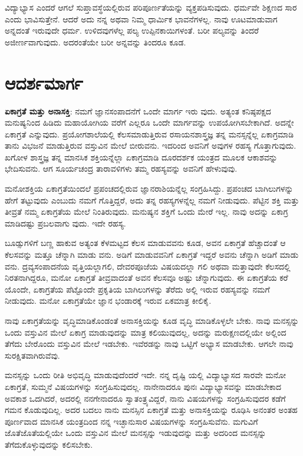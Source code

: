 ವಿದ್ಯಾಭ್ಯಾಸ ಎಂದರೆ ಆಗಲೆ ಸುಪ್ತಾವಸ್ಥೆಯಲ್ಲಿರುವ ಪರಿಪೂರ್ಣತೆಯನ್ನು ವ್ಯಕ್ತಪಡಿಸುವುದು. ಧರ್ಮವೇ ಶಿಕ್ಷಣದ ಸಾರ ಎಂದು ಭಾವಿಸುತ್ತೇನೆ. ಆದರೆ ಅದು ನನ್ನ ಅಥವಾ ನಿಮ್ಮ ಧಾರ್ಮಿಕ ಭಾವನೆಗಳಲ್ಲ. ನಾವು ಊಟಮಾಡುವಾಗ ಅನ್ನದಂತೆ ಇರುವುದೇ ಧರ್ಮ. ಉಳಿದವುಗಳೆಲ್ಲ ಪಲ್ಯ ಉಪ್ಪಿನಕಾಯಿಗಳಂತೆ. ಬರೀ ಪಲ್ಯವನ್ನು ತಿಂದರೆ ಅಜೀರ್ಣವಾಗುವುದು. ಅದರಂತೆಯೇ ಬರೀ ಅನ್ನವನ್ನು ತಿಂದರೂ ಕೂಡ.


\section{ಆದರ್ಶಮಾರ್ಗ}

\textbf{ಏಕಾಗ್ರತೆ ಮತ್ತು ಅನಾಸಕ್ತಿ}: ನಮಗೆ ಜ್ಞಾನಸಂಪಾದನೆಗೆ ಒಂದೇ ಮಾರ್ಗ ಇರು ವುದು. ಅತ್ಯಂತ ಕನಿಷ್ಠಪಕ್ಷದ ಮನುಷ್ಯನಿಂದ ಹಿಡಿದು ಮಹಾಯೋಗಿಯ ವರೆಗೆ ಎಲ್ಲರೂ ಒಂದೇ ಮಾರ್ಗವನ್ನು ಉಪಯೋಗಿಸಬೇಕಾಗಿದೆ. ಅದನ್ನೇ ಏಕಾಗ್ರತೆ ಎನ್ನುವುದು. ಪ್ರಯೋಗಶಾಲೆಯಲ್ಲಿ ಕೆಲಸಮಾಡುತ್ತಿರುವ ರಸಾಯನಶಾಸ್ತ್ರಜ್ಞ ತನ್ನ ಮನಸ್ಸನ್ನೆಲ್ಲ ಏಕಾಗ್ರಮಾಡಿ ತಾನು ವಿಭಜನೆ ಮಾಡುತ್ತಿರುವ ವಸ್ತುವಿನ ಮೇಲೆ ಬೀರುವನು. ಇದರಿಂದ ಅವನಿಗೆ ಅವುಗಳ ರಹಸ್ಯ ಗೊತ್ತಾಗುವುದು. ಖಗೋಳ ಶಾಸ್ತ್ರಜ್ಞ ತನ್ನ ಮಾನಸಿಕ ಶಕ್ತಿಯನ್ನೆಲ್ಲಾ ಏಕಾಗ್ರಮಾಡಿ ದೂರದರ್ಶಕ ಯಂತ್ರದ ಮೂಲಕ ಆಕಾಶವನ್ನು ಭೇದಿಸುವನು. ಆಗ ಸೂರ್ಯಚಂದ್ರ ತಾರಾವಳಿಗಳು ತಮ್ಮ ರಹಸ್ಯವನ್ನು ಅವನಿಗೆ ಹೇಳುವುವು.

ಮನೋಶಕ್ತಿಯ ಏಕಾಗ್ರತೆಯಿಂದಲೆ ಪ್ರಪಂಚದಲ್ಲಿರುವ ಜ್ಞಾನರಾಶಿಯನ್ನೆಲ್ಲ ಸಂಗ್ರಹಿಸಿದ್ದು. ಪ್ರಪಂಚದ ಬಾಗಿಲುಗಳನ್ನು ಹೇಗೆ ತಟ್ಟುವುದು ಎಂಬುದು ನಮಗೆ ಗೊತ್ತಿದ್ದರೆ, ಅದು ತನ್ನ ರಹಸ್ಯಗಳನ್ನೆಲ್ಲ ನಮಗೆ ನೀಡುವುದು. ಪೆಟ್ಟಿನ ಶಕ್ತಿ ಮತ್ತು ತೀವ್ರತೆ ನಮ್ಮ ಏಕಾಗ್ರತೆಯ ಮೇಲೆ ನಿಂತಿರುವುದು. ಮನುಷ್ಯನ ಶಕ್ತಿಗೆ ಒಂದು ಮೇರೆ ಇಲ್ಲ. ನಾವು ಅದನ್ನು ಏಕಾಗ್ರ ಮಾಡಿದಷ್ಟು ಪ್ರಬಲವಾಗು ವುದು. ಇದೇ ರಹಸ್ಯ.

ಬೂಡ್ಸುಗಳಿಗೆ ಬಣ್ಣ ಹಾಕುವ ಅತ್ಯಂತ ಕೆಳಮಟ್ಟದ ಕೆಲಸ ಮಾಡುವವನು ಕೂಡ, ಅವನ ಏಕಾಗ್ರತೆ ಹೆಚ್ಚಾದಂತೆ ಆ ಕೆಲಸವನ್ನು ಮತ್ತೂ ಚೆನ್ನಾಗಿ ಮಾಡು ವನು. ಅಡಿಗೆ ಮಾಡುವವನಿಗೆ ಏಕಾಗ್ರತೆ ಇದ್ದರೆ ಅವನು ಚೆನ್ನಾಗಿ ಅಡಿಗೆ ಮಾಡು ವನು. ದ್ರವ್ಯಸಂಪಾದನೆಯ ವೃತ್ತಿಯಲ್ಲಾಗಲಿ, ದೇವರಪೂಜೆಯ ವಿಷಯದಲ್ಲಾ ಗಲಿ ಅಥವಾ ಮತ್ತಾವುದೇ ಕೆಲಸದಲ್ಲಿ ನಿರತನಾಗಿದ್ದರೂ, ಮನೋ ಏಕಾಗ್ರತೆ ತೀವ್ರವಾದಂತೆ ಅವನ ಕೆಲಸವೂ ಅಷ್ಟು ಚೆನ್ನಾಗುವುದು. ಈ ಏಕಾಗ್ರತೆಯ ಕರೆ ಯೊಂದೇ, ಏಕಾಗ್ರತೆಯ ಪೆಟ್ಟೊಂದೇ ಪ್ರಕೃತಿಯ ಬಾಗಿಲುಗಳನ್ನು ತೆರೆದು ಅಲ್ಲಿ ಇರುವ ರಹಸ್ಯವನ್ನು ನಮಗೆ ನೀಡುವುದು. ಮನೋ ಏಕಾಗ್ರತೆಯೇ ಜ್ಞಾನ ಭಂಡಾರಕ್ಕೆ ಇರುವ ಏಕಮಾತ್ರ ಕೀಲಿಕೈ.

ನಾವು ಏಕಾಗ್ರತೆಯನ್ನು ವೃದ್ಧಿಮಾಡಿಕೊಂಡಂತೆ ಅನಾಸಕ್ತಿಯನ್ನು ಕೂಡ ವೃದ್ಧಿ ಮಾಡಿಕೊಳ್ಳಲೇ ಬೇಕು. ನಾವು ಮನಸ್ಸನ್ನು ಒಂದು ವಸ್ತುವಿನ ಮೇಲೆ ಏಕಾಗ್ರ ಮಾಡುವುದನ್ನು ಮಾತ್ರ ಕಲಿಯುವುದಲ್ಲ, ಅದನ್ನು ಮರುಕ್ಷಣದಲ್ಲಿಯೇ ಅಲ್ಲಿಂದ ತೆಗೆದು ಬೇರೊಂದು ವಸ್ತುವಿನ ಮೇಲೆ ಇಡಬೇಕು. ಇವೆರಡನ್ನು ನಾವು ಒಟ್ಟಿಗೆ ಅಭ್ಯಾಸ ಮಾಡಬೇಕು. ಆಗಲೇ ನಾವು ಸುರಕ್ಷಿತವಾಗಿರುವೆವು.

ಮನಸ್ಸನ್ನು ಒಂದು ರೀತಿ ಅಭಿವೃದ್ಧಿ ಮಾಡುವುದೆಂದರೆ ಇದೇ. ನನ್ನ ದೃಷ್ಟಿ ಯಲ್ಲಿ ವಿದ್ಯಾಭ್ಯಾಸದ ಸಾರವೇ ಮನೋ ಏಕಾಗ್ರತೆ, ಸುಮ್ಮನೆ ವಿಷಯಗಳನ್ನು ಸಂಗ್ರಹಿಸುವುದಲ್ಲ. ನಾನೇನಾದರೂ ಪುನಃ ವಿದ್ಯಾಭ್ಯಾಸವನ್ನು ಮಾಡಬೇಕಾದ ಅವಕಾಶ ಒದಗಿದರೆ, ಅದರಲ್ಲಿ ನನಗೇನಾದರೂ ಸ್ವಾತಂತ್ರ್ಯವಿದ್ದರೆ, ನಾನು ವಿಷಯಗಳನ್ನು ಸಂಗ್ರಹಿಸುವುದರ ಕಡೆಗೆ ಗಮನ ಕೊಡುವುದಿಲ್ಲ. ಅದರ ಬದಲು ನಾನು ಮನಸ್ಸಿನ ಏಕಾಗ್ರತೆ ಮತ್ತು ಅನಾಸಕ್ತಿಯನ್ನು ರೂಢಿಸಿ ಅನಂತರ ಅಂತಹ ಪೂರ್ಣವಾದ ಮಾನಸಿಕ ಯಂತ್ರದಿಂದ ನನ್ನ ಇಚ್ಛಾನುಸಾರ ವಿಷಯಗಳನ್ನು ಸಂಗ್ರಹಿಸುವೆನು. ಮಗುವಿಗೆ ಜೊತೆಜೊತೆಯಲ್ಲಿಯೇ ಒಂದು ವಸ್ತುವಿನ ಮೇಲೆ ಮನಸ್ಸನ್ನು ಇಡುವುದನ್ನು ಮತ್ತು ಅದರಿಂದ ಮನಸ್ಸನ್ನು ತೆಗೆದುಕೊಳ್ಳುವುದನ್ನು ಕಲಿಸಬೇಕು.

